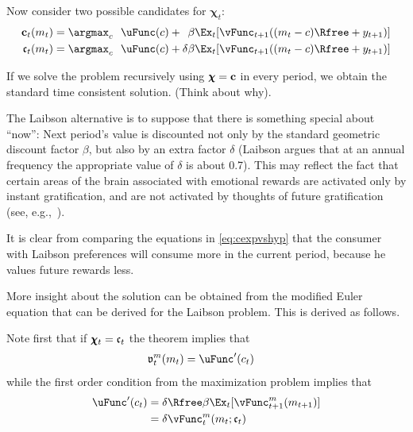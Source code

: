 \documentclass{handout}
\begin{document}
Now consider two possible candidates for $\pmb{\chi}_{t}$:
\begin{equation}\begin{gathered}\begin{aligned}
    \bc_{t}(m_{t}) & =  \argmax_{c}~~ \bu(c) +  \phantom{\delta} \beta \Ex_{t}[\bv_{t+1}((m_{t}-c)\Rfree+y_{t+1})] \label{eq:cexpvshyp}
\\  \gc_{t}(m_{t}) & =  \argmax_{c}~~ \bu(c) +           \delta  \beta \Ex_{t}[\bv_{t+1}((m_{t}-c)\Rfree+y_{t+1})] %
\end{aligned}\end{gathered}\end{equation}

If we solve the problem recursively using $\pmb{\chi}=\mathbf{c}$ in every period, we
obtain the standard time consistent solution.  (Think about why).

The Laibson alternative is to suppose that there is something special
about ``now'': Next period's value is discounted not only by the standard
geometric discount factor $\beta$, but also by an extra factor $\delta$ (Laibson
argues that at an annual frequency the appropriate value of $\delta$ is about 0.7).
This may reflect the fact that certain areas of the brain associated with emotional
rewards are activated only by instant gratification, and are not activated by thoughts
of future gratification (see, e.g.,~\cite{laibsonNeuro}).

It is clear from comparing the equations in \eqref{eq:cexpvshyp} that the consumer 
with Laibson preferences will consume more in the current period, because he 
values future rewards less.  

More insight about the solution can be obtained from the modified Euler 
equation that can be derived for the Laibson problem.  This is derived as follows.

Note first that if $\pmb{\chi}_{t} = \mathfrak{c}_{t}$ the  theorem implies
that 
\begin{equation}\begin{gathered}\begin{aligned}
  \gv_{t}^{m}(m_{t}) & =  \bu^{\prime}(c_{t})
\end{aligned}\end{gathered}\end{equation}
while the first order condition from the maximization problem implies that
\begin{equation}\begin{gathered}\begin{aligned}
  \bu^{\prime}(c_{t}) & =  \delta \Rfree\beta \Ex_{t}[\bv_{t+1}^{m}(m_{t+1})] \label{eq:foc}
\\ & =  \delta \bv_{t}^{m}(m_{t};\gc_{t})
\end{aligned}\end{gathered}\end{equation}
\end{document}
